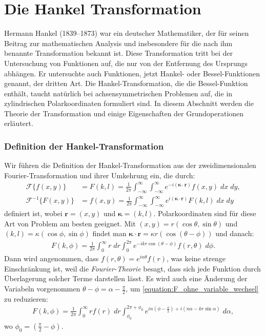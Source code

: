 %
%

\section{Die Hankel Transformation \label{kreismembran:section:teil2}}

Hermann Hankel (1839--1873) war ein deutscher Mathematiker, der für seinen Beitrag zur mathematischen Analysis und insbesondere für die nach ihm benannte Transformation bekannt ist.
Diese Transformation tritt bei der Untersuchung von Funktionen auf, die nur von der Entfernung des Ursprungs abhängen.
Er untersuchte auch Funktionen, jetzt Hankel- oder Bessel-Funktionen genannt, der dritten Art.
Die Hankel-Transformation, die die Bessel-Funktion enthält, taucht natürlich bei achsensymmetrischen Problemen auf, die in zylindrischen Polarkoordinaten formuliert sind.
In diesem Abschnitt werden die Theorie der Transformation und einige Eigenschaften der Grundoperationen erläutert.

\subsubsection{Definition der Hankel-Transformation \label{subsub:hankel_tansformation}}
Wir führen die Definition der Hankel-Transformation \cite{lokenath_debnath_integral_2015} aus der zweidimensionalen Fourier-Trans\-formation und ihrer Umkehrung ein, die durch:
\begin{align}
	\mathscr{F}\{f(x,y)\} & = F(k,l)=\frac{1}{2\pi}\int_{-\infty}^{\infty}\int_{-\infty}^{\infty}e^{-i( \bm{\kappa}\cdot \mathbf{r})}f(x,y) \; dx \; dy,\label{equation:fourier_transform}\\
	\mathscr{F}^{-1}\{F(x,y)\} & = f(x,y)=\frac{1}{2\pi}\int_{-\infty}^{\infty}\int_{-\infty}^{\infty}e^{i(\bm{\kappa}\cdot \mathbf{r})}F(k,l) \; dx \; dy \label{equation:inv_fourier_transform}
\end{align}
definiert ist, wobei $\mathbf{r}=(x,y)$ und $\bm{\kappa}=(k,l)$. Polarkoordinaten sind für diese Art von Problem am besten geeignet. Mit $(x,y)=r(\cos\theta,\sin\theta)$ und $(k,l)=\kappa(\cos\phi,\sin\phi)$ findet man $\bm{\kappa}\cdot\mathbf{r}=\kappa r(\cos(\theta-\phi))$ und danach:
\begin{align}
	F(k,\phi)=\frac{1}{2\pi}\int_{0}^{\infty}r \; dr \int_{0}^{2\pi}e^{-ikr\cos(\theta-\phi)}f(r,\theta) \; d\phi.
	\label{equation:F_ohne_variable_wechsel}
\end{align}
Dann wird angenommen, dass $f(r,\theta)=e^{in\theta}f(r)$, was keine strenge Einschränkung ist, weil die \textit{Fourier-Theorie} besagt, dass sich jede Funktion durch Überlagerung solcher Terme darstellen lässt. Es wird auch eine Änderung der Variabeln vorgenommen $\theta-\phi=\alpha-\frac{\pi}{2}$, um \eqref{equation:F_ohne_variable_wechsel} zu reduzieren:
\begin{align}
	F(k,\phi)=\frac{1}{2\pi}\int_{0}^{\infty}rf(r) \; dr \int_{\phi_{0}}^{2\pi+\phi_{0}}e^{in(\phi-\frac{\pi}{2})+i(n\alpha-kr\sin\alpha)} \; d\alpha,
	\label{equation:F_ohne_bessel}
\end{align}
wo $\phi_{0}=(\frac{\pi}{2}-\phi)$.

